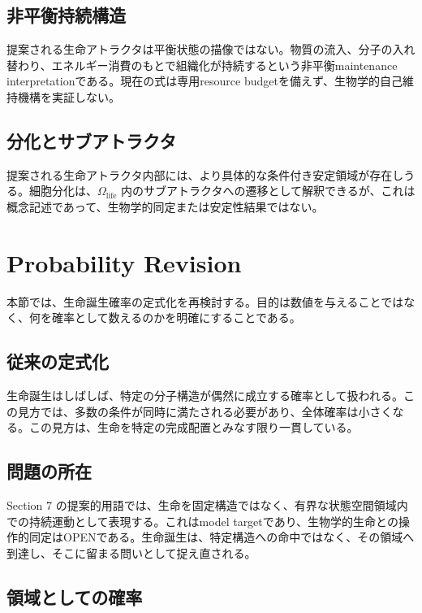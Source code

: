 \documentclass[11pt]{ltjsarticle}
\begin{document}
\subsection{非平衡持続構造}

提案される生命アトラクタは平衡状態の描像ではない。物質の流入、分子の入れ替わり、エネルギー消費のもとで組織化が持続するという非平衡maintenance interpretationである。現在の式は専用resource budgetを備えず、生物学的自己維持機構を実証しない。

\subsection{分化とサブアトラクタ}

提案される生命アトラクタ内部には、より具体的な条件付き安定領域が存在しうる。細胞分化は、\(\Omega_{\mathrm{life}}\) 内のサブアトラクタへの遷移として解釈できるが、これは概念記述であって、生物学的同定または安定性結果ではない。

\section{Probability Revision}

本節では、生命誕生確率の定式化を再検討する。目的は数値を与えることではなく、何を確率として数えるのかを明確にすることである。

\subsection{従来の定式化}

生命誕生はしばしば、特定の分子構造が偶然に成立する確率として扱われる。この見方では、多数の条件が同時に満たされる必要があり、全体確率は小さくなる。この見方は、生命を特定の完成配置とみなす限り一貫している。

\subsection{問題の所在}

Section 7 の提案的用語では、生命を固定構造ではなく、有界な状態空間領域内での持続運動として表現する。これはmodel targetであり、生物学的生命との操作的同定はOPENである。生命誕生は、特定構造への命中ではなく、その領域へ到達し、そこに留まる問いとして捉え直される。

\subsection{領域としての確率}
\end{document}
